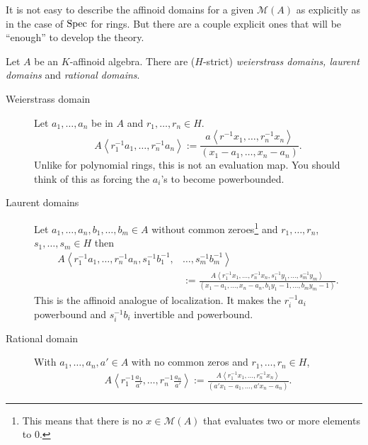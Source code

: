 It is not easy to describe the affinoid domains for a given $\mathcal{M} (A)$ as explicitly as in the case of $\operatorname{Spec}$ for rings. 
But there are a couple explicit ones that will be ``enough'' to develop the theory. 
\begin{definition}
	Let $A$ be an $K$-affinoid algebra. 
	There are ($H$-strict) \emph{weierstrass domains, laurent domains} and \emph{rational domains}. 
	\begin{description}
		\item[Weierstrass domain] Let $a_1, \ldots, a_n$ be in $A$ and $r_1, \ldots, r_n \in H$. 
			\[
				A\left<r_1^{-1}a_1, \ldots, r_n^{-1}a_n \right> := \frac{a\left<r^{-1}x_1, \ldots, r^{-1}_nx_n \right>}{(x_1-a_1, \ldots, x_n - a_n)}
			.\] 
			Unlike for polynomial rings, this is not an evaluation map. You should think of this as forcing the $a_i$'s to become powerbounded. 
		\item [Laurent domains]
			Let $a_1, \ldots, a_n, b_1, \ldots, b_m \in A$ without common zeroes\footnote{This means that there is no $x \in \mathcal{M} (A)$ that evaluates two or more elements to $0$.} and $r_1,\ldots, r_n$, $s_1, \ldots, s_m \in H$ then 
			\begin{align*}
				A\left<r_1^{-1}a_1, \ldots, r_n^{-1}a_n, s^{-1}_1b_1^{-1}, \right. & \left. \ldots, s^{-1}_mb_m^{-1} \right> \\
				&:= \frac{A\left<r^{-1}_1x_1, \ldots, r^{-1}_nx_n,s^{-1}_1y_1, \ldots,s_m^{-1} y_m  \right>}{(x_1 - a_1, \ldots, x_n - a_n, b_1 y_1 - 1, \ldots, b_m y_m - 1)}
			.\end{align*} 
			This is the affinoid analogue of localization. It makes the $r_i^{-1}a_i$ powerbound and $s_i^{-1}b_i$ invertible and powerbound. 
		\item[Rational domain] With $a_1, \ldots, a_n, a' \in A$ with no common zeros and $r_1, \ldots, r_n \in H$,
			\begin{align*}
				A \left<r_1^{-1}\frac{a_1}{a'}, \ldots, r_n^{-1}\frac{a_n}{a'} \right> := \frac{A\left<r_1^{-1}x_1, \ldots, r_n^{-1}x_n \right>}{(a' x_1 - a_1, \ldots, a' x_n - a_n)}
			.\end{align*}
	\end{description}
\end{definition}

